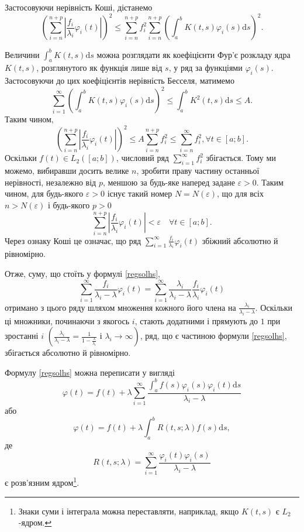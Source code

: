 \documentclass[14pt,twoside]{extreport}
\theoremstyle{mystyle}
\numberwithin{equation}{chapter}
\begin{document}
Застосовуючи нерівність Коші, дістанемо
\[
 \left(\sum_{i=n}^{n+p} \left|\frac{f_i}{\lambda_i} \varphi_i(t)\right|\right)^2 \leqslant \sum_{i=n}^{n+p} f_i^2 \sum_{i=n}^{n+p} \left(\int_a^b K(t, s) \varphi_i(s) \mathrm{d} s\right)^2.
\]

Величини $\displaystyle\int_a^b K(t, s) \mathrm{d}s$ можна розглядати як коефіцієнти Фур'є розкладу ядра $K(t, s)$, розглянутого як функція лише від $s$, у ряд за функціями $\varphi_i(s)$. Застосовуючи до цих коефіцієнтів нерівність Бесселя, матимемо
\[
 \sum_{i=1}^{\infty} \left(\int_a^b K(t, s) \varphi_i(s) \mathrm{d} s\right)^2 \leqslant \int_a^b K^2(t, s) \mathrm{d}s \leqslant A.
\]
Таким чином,
\[
 \left(\sum_{i=n}^{n+p} \left|\frac{f_i}{\lambda_i} \varphi_i(t)\right|\right)^2 \leqslant A \sum_{i=n}^{n+p} f_i^2 \leqslant \sum_{i=n}^{\infty} f_i^2, \forall t \in [a; b].
\]
Оскільки $f(t) \in L_2([a; b])$, числовий ряд $\sum\limits_{i=1}^{\infty} f_i^2$ збігається. Тому ми можемо, вибиравши досить велике $n$, зробити праву частину останньої нерівності, незалежно від $p$, меншою за будь-яке наперед задане $\varepsilon > 0$. Таким чином, для будь-якого $\varepsilon > 0$ існує такий номер $N=N(\varepsilon)$, що для всіх $n > N(\varepsilon)$ і будь-якого $p > 0$
\[
 \sum_{i=n}^{n+p} \left|\frac{f_i}{\lambda_i}\varphi_i(t)\right| <\varepsilon \quad\forall t \in [a; b].
\]
Через ознаку Коші це означає, що ряд $\sum\limits_{i=1}^{\infty} \frac{f_i}{\lambda_i}\varphi_i(t)$ збіжний абсолютно й рівномірно.

Отже, суму, що стоїть у формулі \eqref{regsolhs},
\[
 \sum_{i=1}^{\infty} \frac{f_i}{\lambda_i - \lambda} \varphi_i(t)= \sum_{i=1}^{\infty} \frac{\lambda_i}{\lambda_i - \lambda} \frac{f_i}{\lambda_i}\varphi_i(t)
\]
отримано з цього ряду шляхом множення кожного його члена на $\frac{\lambda_i}{\lambda_i - \lambda}$. Оскільки ці множники, починаючи з якогось $i$, стають додатними і прямують до $1$ при зростанні $i$ $\left(\frac{\lambda_i}{\lambda_i-\lambda}=\frac{1}{1- \frac{\lambda}{\lambda_i}}\textrm{ і }\lambda_i \to \infty\right)$, ряд, що є частиною формули \eqref{regsolhs}, збігається абсолютно й рівномірно.

Формулу \eqref{regsolhs} можна переписати у вигляді
\[
 \varphi(t) = f(t) + \lambda \sum_{i=1}^{\infty} \dfrac{\int_a^bf(s) \varphi_i(s) \varphi_i(t) \mathrm{d}s}{\lambda_i - \lambda}
\]
або
\[
 \varphi(t) = f(t) + \lambda \int_a^b R(t, s; \lambda) f(s) \mathrm{d}s,
\]
де
\[
 R(t, s; \lambda) = \sum_{i=1}^{\infty} \dfrac{\varphi_i(t) \varphi_i(s)}{\lambda_i - \lambda}
\]
є розв'язним ядром\footnote{Знаки суми і інтеграла можна переставляти, наприклад, якщо $K(t, s)$ є $L_2$-ядром.}.
\end{document}
